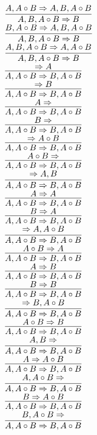 \documentclass[11pt]{article}
\begin{document}
\begin{center}
\bigskip
\\$\infer{A, B, A\circ B\Rightarrow B}{A, A\circ B\Rightarrow A, B, A\circ B}$
\bigskip
\\$\infer{A, B, A\circ B\Rightarrow B}{B, A\circ B\Rightarrow A, B, A\circ B}$
\bigskip
\\$\infer{A, B, A\circ B\Rightarrow B}{A, B, A\circ B\Rightarrow A, A\circ B}$
\bigskip
\\$\infer{A, A\circ B\Rightarrow B, A\circ B}{\Rightarrow A}$
\bigskip
\\$\infer{A, A\circ B\Rightarrow B, A\circ B}{\Rightarrow B}$
\bigskip
\\$\infer{A, A\circ B\Rightarrow B, A\circ B}{A\Rightarrow }$
\bigskip
\\$\infer{A, A\circ B\Rightarrow B, A\circ B}{B\Rightarrow }$
\bigskip
\\$\infer{A, A\circ B\Rightarrow B, A\circ B}{\Rightarrow A\circ B}$
\bigskip
\\$\infer{A, A\circ B\Rightarrow B, A\circ B}{A\circ B\Rightarrow }$
\bigskip
\\$\infer{A, A\circ B\Rightarrow B, A\circ B}{\Rightarrow A, B}$
\bigskip
\\$\infer{A, A\circ B\Rightarrow B, A\circ B}{A\Rightarrow A}$
\bigskip
\\$\infer{A, A\circ B\Rightarrow B, A\circ B}{B\Rightarrow A}$
\bigskip
\\$\infer{A, A\circ B\Rightarrow B, A\circ B}{\Rightarrow A, A\circ B}$
\bigskip
\\$\infer{A, A\circ B\Rightarrow B, A\circ B}{A\circ B\Rightarrow A}$
\bigskip
\\$\infer{A, A\circ B\Rightarrow B, A\circ B}{A\Rightarrow B}$
\bigskip
\\$\infer{A, A\circ B\Rightarrow B, A\circ B}{B\Rightarrow B}$
\bigskip
\\$\infer{A, A\circ B\Rightarrow B, A\circ B}{\Rightarrow B, A\circ B}$
\bigskip
\\$\infer{A, A\circ B\Rightarrow B, A\circ B}{A\circ B\Rightarrow B}$
\bigskip
\\$\infer{A, A\circ B\Rightarrow B, A\circ B}{A, B\Rightarrow }$
\bigskip
\\$\infer{A, A\circ B\Rightarrow B, A\circ B}{A\Rightarrow A\circ B}$
\bigskip
\\$\infer{A, A\circ B\Rightarrow B, A\circ B}{A, A\circ B\Rightarrow }$
\bigskip
\\$\infer{A, A\circ B\Rightarrow B, A\circ B}{B\Rightarrow A\circ B}$
\bigskip
\\$\infer{A, A\circ B\Rightarrow B, A\circ B}{B, A\circ B\Rightarrow }$

\end{center}
\end{document}

